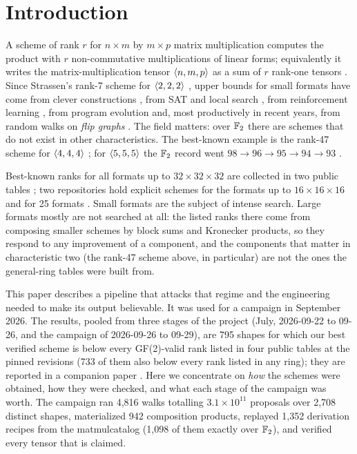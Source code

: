 \section{Introduction}\label{sec:intro}

A scheme of rank $r$ for $n\times m$ by $m\times p$ matrix multiplication computes the product with $r$
non-commutative multiplications of linear forms; equivalently it writes the matrix-multiplication
tensor $\langle n,m,p\rangle$ as a sum of $r$ rank-one tensors \cite{burgisser1997algebraic,landsberg2012tensors,blaser2013fast}.
Since Strassen's rank-7 scheme for $\langle 2,2,2\rangle$ \cite{strassen1969gaussian}, upper bounds for small formats have come from
clever constructions \cite{hopcroft1971minimizing,laderman1976noncommutative,smirnov2013bilinear}, from
SAT and local search \cite{heule2019local,heule2021new}, from reinforcement learning \cite{fawzi2022discovering}, from
program evolution \cite{novikov2025alphaevolve} and, most productively in recent years, from random walks on \emph{flip graphs}
\cite{kauers2023flip,arai2024adaptive,moosbauer2025flip,kauers2025meta,perminov2025ternary}.
The field matters: over ${\mathbb{F}_2}$ there are schemes that do not exist in other characteristics.
The best-known example is the rank-47 scheme for $\langle 4,4,4\rangle$ \cite{fawzi2022discovering}; for $\langle 5,5,5\rangle$ the ${\mathbb{F}_2}$ record
went $98\to96\to95\to94\to93$ \cite{sedoglavic2021tensor,fawzi2022discovering,kauers2022still,arai2024adaptive,moosbauer2025flip}.

Best-known ranks for all formats up to $32\times32\times32$ are collected in two public tables
\cite{sedoglavic2026catalogue,lacelle2026catalog}; two repositories hold explicit schemes for the formats up to $16\times16\times16$
\cite{perminov2026fmmrepo} and for 25 formats \cite{witteveen2026schemes}.
Small formats are the subject of intense search.
Large formats mostly are not searched at all: the listed ranks there come from composing smaller
schemes by block sums and Kronecker products, so they respond to any improvement of a component,
and the components that matter in characteristic two (the rank-47 scheme above, in particular) are
not the ones the general-ring tables were built from.

This paper describes a pipeline that attacks that regime and the engineering needed to make its
output believable.
It was used for a campaign in September 2026. The results, pooled from three stages of the project (July, 2026-09-22 to 09-26,
and the campaign of 2026-09-26 to 09-29), are 795 shapes for which our best verified scheme is below every GF(2)-valid rank listed in four public tables at the pinned revisions
(733 of them also below every rank listed in any ring); they are reported in a companion paper \cite{peterson2026results}.
Here we concentrate on \emph{how} the schemes were obtained, how they were checked, and what each stage of the campaign was worth.
The campaign ran 4{,}816 walks totalling \(3.1\times10^{11}\) proposals over 2{,}708 distinct shapes,
materialized 942 composition products, replayed 1{,}352 derivation recipes from the matmulcatalog (1{,}098 of them exactly over ${\mathbb{F}_2}$),
and verified every tensor that is claimed.

